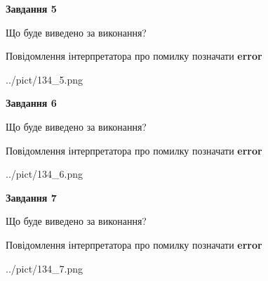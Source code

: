 \documentclass[10pt, ukrainian]{article}
\begin{document}
{\begin {large}
{\begin {center}\textbf{Завдання 5}\end {center}}\par
Що буде виведено за виконання? \par
Повідомлення інтерпретатора про помилку позначати \textbf{error}

\begin{center}
	{../pict/134_5.png}
\end{center}
\newpage

{\begin {center}\textbf{Завдання 6}\end {center}}\par
Що буде виведено за виконання? \par
Повідомлення інтерпретатора про помилку позначати \textbf{error}

\begin{center}
	{../pict/134_6.png}
\end{center}
\newpage

{\begin {center}\textbf{Завдання 7}\end {center}}\par
Що буде виведено за виконання? \par
Повідомлення інтерпретатора про помилку позначати \textbf{error}

\begin{center}
	{../pict/134_7.png}
\end{center}
\newpage

\end {large}}
\end{document}
